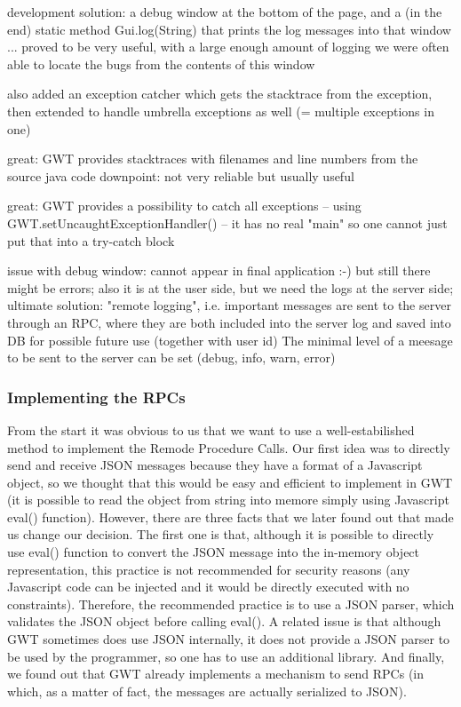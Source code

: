 development solution: a debug window at the bottom of the page, and a (in the end) static method Gui.log(String) that prints the log messages into that window
... proved to be very useful, with a large enough amount of logging we were often able to locate the bugs from the contents of this window

also added an exception catcher which gets the stacktrace from the exception, then extended to handle umbrella exceptions as well (= multiple exceptions in one)

great: GWT provides stacktraces with filenames and line numbers from the source java code
downpoint: not very reliable but usually useful

great: GWT provides a possibility to catch all exceptions -- using GWT.setUncaughtExceptionHandler() -- it has no real "main" so one cannot just put that into a try-catch block

issue with debug window: cannot appear in final application :-) but still there might be errors;
also it is at the user side, but we need the logs at the server side;
ultimate solution: "remote logging", i.e. important messages are sent to the server through an RPC, where they are both included into the server log and saved into DB for possible future use (together with user id)
The minimal level of a meesage to be sent to the server can be set (debug, info, warn, error)

\subsubsection{Implementing the RPCs}

From the start it was obvious to us that we want to use a well-estabilished method to implement the Remode Procedure Calls. Our first idea was to directly send and receive JSON messages because they have a format of a Javascript object, so we thought that this would be easy and efficient to implement in GWT (it is possible to read the object from string into memore simply using Javascript eval() function). However, there are three facts that we later found out that made us change our decision. The first one is that, although it is possible to directly use eval() function to convert the JSON message into the in-memory object representation, this practice is not recommended for security reasons (any Javascript code can be injected and it would be directly executed with no constraints). Therefore, the recommended practice is to use a JSON parser, which validates the JSON object before calling eval(). A related issue is that although GWT sometimes does use JSON internally, it does not provide a JSON parser to be used by the programmer, so one has to use an additional library. And finally, we found out that GWT already implements a mechanism to send RPCs (in which, as a matter of fact, the messages are actually serialized to JSON).

